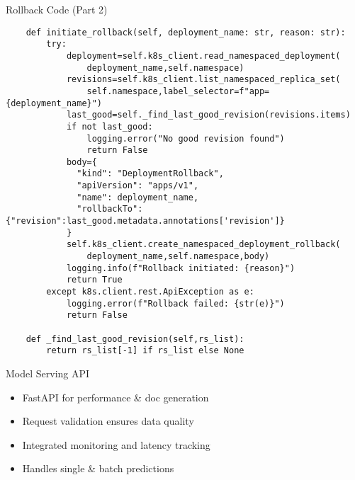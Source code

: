 \documentclass[aspectratio=169]{beamer}
\begin{document}
\begin{frame}[fragile]{Rollback Code (Part 2)}
\begin{verbatim}
    def initiate_rollback(self, deployment_name: str, reason: str):
        try:
            deployment=self.k8s_client.read_namespaced_deployment(
                deployment_name,self.namespace)
            revisions=self.k8s_client.list_namespaced_replica_set(
                self.namespace,label_selector=f"app={deployment_name}")
            last_good=self._find_last_good_revision(revisions.items)
            if not last_good:
                logging.error("No good revision found")
                return False
            body={
              "kind": "DeploymentRollback",
              "apiVersion": "apps/v1",
              "name": deployment_name,
              "rollbackTo": {"revision":last_good.metadata.annotations['revision']}
            }
            self.k8s_client.create_namespaced_deployment_rollback(
                deployment_name,self.namespace,body)
            logging.info(f"Rollback initiated: {reason}")
            return True
        except k8s.client.rest.ApiException as e:
            logging.error(f"Rollback failed: {str(e)}")
            return False

    def _find_last_good_revision(self,rs_list):
        return rs_list[-1] if rs_list else None
\end{verbatim}
\end{frame}


\begin{frame}{Model Serving API}

\begin{itemize}
\item FastAPI for performance \& doc generation
\item Request validation ensures data quality
\item Integrated monitoring and latency tracking
\item Handles single \& batch predictions
\end{itemize}
\end{frame}
\end{document}

